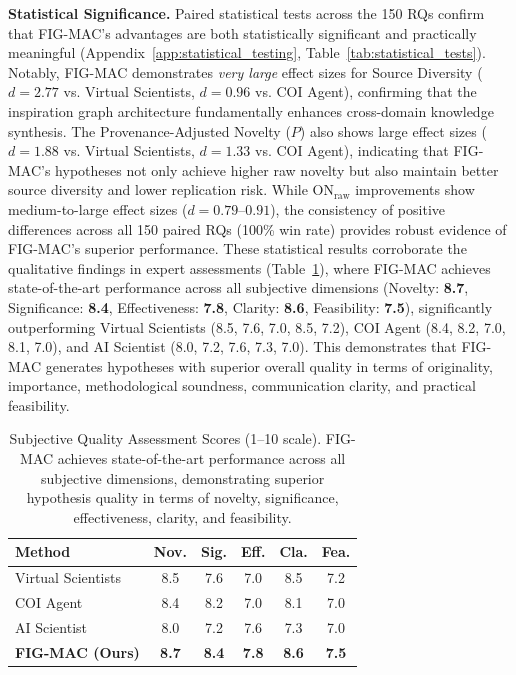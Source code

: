 \documentclass[runningheads]{llncs}
\begin{document}
\textbf{Statistical Significance.} Paired statistical tests across the 150 RQs confirm that FIG-MAC's advantages are both statistically significant and practically meaningful (Appendix~\ref{app:statistical_testing}, Table~\ref{tab:statistical_tests}). Notably, FIG-MAC demonstrates \textit{very large} effect sizes for Source Diversity ($d = 2.77$ vs. Virtual Scientists, $d = 0.96$ vs. COI Agent), confirming that the inspiration graph architecture fundamentally enhances cross-domain knowledge synthesis. The Provenance-Adjusted Novelty ($P$) also shows large effect sizes ($d = 1.88$ vs. Virtual Scientists, $d = 1.33$ vs. COI Agent), indicating that FIG-MAC's hypotheses not only achieve higher raw novelty but also maintain better source diversity and lower replication risk. While ON$_{\text{raw}}$ improvements show medium-to-large effect sizes ($d = 0.79$--$0.91$), the consistency of positive differences across all 150 paired RQs (100\% win rate) provides robust evidence of FIG-MAC's superior performance. These statistical results corroborate the qualitative findings in expert assessments (Table~\ref{tab:subjective_quality}), where FIG-MAC achieves state-of-the-art performance across all subjective dimensions (Novelty: \textbf{8.7}, Significance: \textbf{8.4}, Effectiveness: \textbf{7.8}, Clarity: \textbf{8.6}, Feasibility: \textbf{7.5}), significantly outperforming Virtual Scientists (8.5, 7.6, 7.0, 8.5, 7.2), COI Agent (8.4, 8.2, 7.0, 8.1, 7.0), and AI Scientist (8.0, 7.2, 7.6, 7.3, 7.0). This demonstrates that FIG-MAC generates hypotheses with superior overall quality in terms of originality, importance, methodological soundness, communication clarity, and practical feasibility.

\begin{table}[t]
\centering
\small
\setlength{\tabcolsep}{4pt}
\begin{tabular}{lccccc}
\toprule
\textbf{Method} & \textbf{Nov.} & \textbf{Sig.} & \textbf{Eff.} & \textbf{Cla.} & \textbf{Fea.} \\
\midrule
Virtual Scientists & 8.5 & 7.6 & 7.0 & 8.5 & 7.2 \\
COI Agent & 8.4 & 8.2 & 7.0 & 8.1 & 7.0 \\
AI Scientist & 8.0 & 7.2 & 7.6 & 7.3 & 7.0 \\
\midrule
\textbf{FIG-MAC (Ours)} & \textbf{8.7} & \textbf{8.4} & \textbf{7.8} & \textbf{8.6} & \textbf{7.5} \\
\bottomrule
\end{tabular}
\caption{Subjective Quality Assessment Scores (1--10 scale). FIG-MAC achieves state-of-the-art performance across all subjective dimensions, demonstrating superior hypothesis quality in terms of novelty, significance, effectiveness, clarity, and feasibility.}
\label{tab:subjective_quality}
\end{table}
\end{document}
